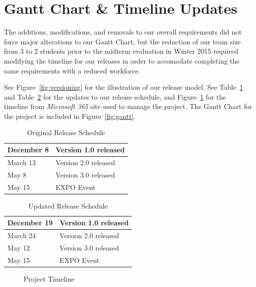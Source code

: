 \documentclass[11pt]{scrreprt}
\begin{document}
\section{Gantt Chart \& Timeline Updates}

The additions, modifications, and removals to our overall requirements did not force major alterations to our Gantt Chart, but the reduction of our team size from 3 to 2 students prior to the midterm evaluation in Winter 2015 required modifying the timeline for our releases in order to accomodate completing the same requirements with a reduced workforce.

See Figure~\ref{fig:versioning} for the illustration of our release model.
See Table~\ref{original_release_schedule} and Table~\ref{updated_release_schedule} for the updates to our release schedule, and Figure~\ref{fig:timeline} for the timeline from \textit{Microsoft 365} site used to manage the project.
The Gantt Chart for the project is included in Figure~\ref{fig:gantt}.

\begin{longtable}{| p{} | p{} |}
\caption[Original Release Schedule]{Original Release Schedule} \label{original_release_schedule} \\
\hline
December 8 & Version 1.0 released\\
\hline
March 13 & Version 2.0 released\\
\hline
May 8 & Version 3.0 released\\
\hline
May 15 & EXPO Event\\
\hline
\end{longtable}

\begin{longtable}{| p{} | p{} |}
\caption[Updated Release Schedule]{Updated Release Schedule} \label{updated_release_schedule} \\
\hline
December 19 & Version 1.0 released\\
\hline
March 24 & Version 2.0 released\\
\hline
May 12 & Version 3.0 released\\
\hline
May 15 & EXPO Event\\
\hline
\end{longtable}

\begin{figure}[ht]
  \caption{Project Timeline}
  \label{fig:timeline}
\end{figure}
\end{document}
